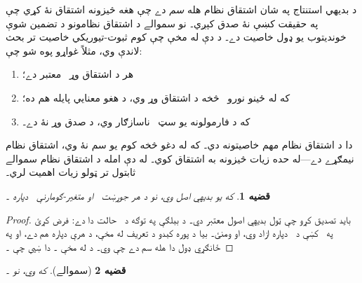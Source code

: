 \documentclass[12pt,a4paper,oneside]{report}
\newcommand{\olfileid}[3]{\gdef\pspart{#1}\gdef\pschapter{#2}\gdef\pssection{#3}}
\gdef\pspart{#2}\gdef\pschapter{#3}\gdef\pssection{}%
\newcommand{\ollabel}[1]{\label{\pspart:\pschapter:\pssection:#1}}
\newtheorem{thm}{قضيه}[chapter]
\newtheorem{prop}[thm]{قضيه}
\theoremstyle{definition}
\newenvironment{explain}{}{}
\begin{document}
\label{olpseg:OLP-0124-B004:start}
\olfileid{fol}{axd}{sou}
\label{olpseg:OLP-0124-B004:end}

\label{olpseg:OLP-0124-B005:start}
\label{olpseg:OLP-0124-B005:end}

\label{olpseg:OLP-0124-B006:start}
\begin{explain}
د بديهي استنتاج په شان اشتقاق نظام هله \emph{سم} دے چې
هغه څيزونه اشتقاق نۀ کړي چې په حقيقت کښې نۀ صدق کېږي۔ نو
سموالے د اشتقاق نظامونو د تضمين شوې خونديتوب يو ډول خاصيت
دے۔ د دې له مخې چې کوم ثبوت-تيوريکي خاصيت تر بحث لاندې وي، مثلاً
غواړو پوه شو چې:
\begin{enumerate}
\item هر د اشتقاق وړ~ معتبر دے؛
\item که  له ځينو نورو~\LR{$\Gamma$} څخه د اشتقاق وړ وي، د هغو
  معنايي پايله هم ده؛
\item که د فارمولونه يو سټ~\LR{$\Gamma$} ناسازګار وي، د صدق وړ نۀ
  دے۔
\end{enumerate}
دا د اشتقاق نظام مهم خاصيتونه دي۔ که له دغو څخه کوم يو
سم نۀ وي، اشتقاق نظام نيمګړے دے---له حده زيات څيزونه به
اشتقاق کوي۔ له دې امله د اشتقاق نظام سموالے ثابتول
تر ټولو زيات اهميت لري۔
\end{explain}
\label{olpseg:OLP-0124-B006:end}

\label{olpseg:OLP-0124-B007:start}
\begin{prop}
  که  يو بديهي اصل وي، نو
  د هر جوړښت~ او متغير-ګومارنې~ دپاره ۔
\end{prop}
\label{olpseg:OLP-0124-B007:end}

\label{olpseg:OLP-0124-B008:start}
\begin{proof}
بايد تصديق کړو چې ټول بديهي اصول معتبر دي۔ د بېلګې
  په توګه د~ حالت دا دے: فرض کړئ  په~
  کښې د~ دپاره ازاد وي، او
   ومنئ۔ بيا د پوره کېدو د تعريف له
  مخې، د هرې  دپاره  هم
  دے، او په ځانګړي ډول دا هله سم دے چې
   وي۔ د
   له مخې
  ۔ دا ښيي چې
  ۔
\end{proof}
\label{olpseg:OLP-0124-B008:end}

\label{olpseg:OLP-0124-B009:start}
\begin{thm}[سموالے]
\ollabel{thm:soundness}
که  وي، نو ۔
\end{thm}
\label{olpseg:OLP-0124-B009:end}
\end{document}
